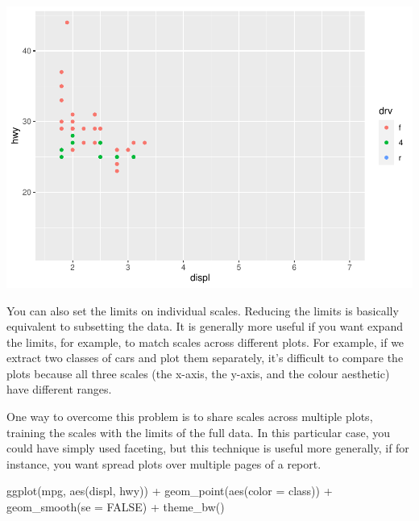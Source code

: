 \documentclass[
]{article}
\newenvironment{Shaded}{\begin{snugshade}}{\end{snugshade}}
\newcommand{\AttributeTok}[1]{\textcolor[rgb]{0.77,0.63,0.00}{#1}}
\newcommand{\ConstantTok}[1]{\textcolor[rgb]{0.00,0.00,0.00}{#1}}
\newcommand{\FunctionTok}[1]{\textcolor[rgb]{0.00,0.00,0.00}{#1}}
\newcommand{\NormalTok}[1]{#1}
\newcommand{\SpecialCharTok}[1]{\textcolor[rgb]{0.00,0.00,0.00}{#1}}
\begin{document}
\includegraphics{Journal_files/figure-latex/unnamed-chunk-67-6.pdf}

You can also set the limits on individual scales. Reducing the limits is
basically equivalent to subsetting the data. It is generally more useful
if you want expand the limits, for example, to match scales across
different plots. For example, if we extract two classes of cars and plot
them separately, it's difficult to compare the plots because all three
scales (the x-axis, the y-axis, and the colour aesthetic) have different
ranges.

One way to overcome this problem is to share scales across multiple
plots, training the scales with the limits of the full data. In this
particular case, you could have simply used faceting, but this technique
is useful more generally, if for instance, you want spread plots over
multiple pages of a report.

\begin{Shaded}
\begin{Highlighting}[]
\FunctionTok{ggplot}\NormalTok{(mpg, }\FunctionTok{aes}\NormalTok{(displ, hwy)) }\SpecialCharTok{+}
  \FunctionTok{geom\_point}\NormalTok{(}\FunctionTok{aes}\NormalTok{(}\AttributeTok{color =}\NormalTok{ class)) }\SpecialCharTok{+}
  \FunctionTok{geom\_smooth}\NormalTok{(}\AttributeTok{se =} \ConstantTok{FALSE}\NormalTok{) }\SpecialCharTok{+}
  \FunctionTok{theme\_bw}\NormalTok{()}
\end{Highlighting}
\end{Shaded}
\end{document}
